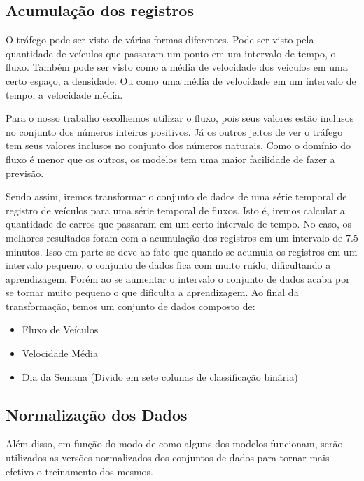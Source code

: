 \subsection{Acumulação dos registros}

O tráfego pode ser visto de várias formas diferentes. Pode ser visto pela quantidade de veículos que passaram um ponto em um intervalo de tempo, o fluxo. Também pode ser visto como a média de velocidade dos veículos em uma certo espaço, a densidade. Ou como uma média de velocidade em um intervalo de tempo, a velocidade média.

Para o nosso trabalho escolhemos utilizar o fluxo, pois seus valores estão inclusos no conjunto dos números inteiros positivos. Já os outros jeitos de ver o tráfego tem seus valores inclusos no conjunto dos números naturais. Como o domínio do fluxo é menor que os outros, os modelos tem uma maior facilidade de fazer a previsão.

Sendo assim, iremos transformar o conjunto de dados de uma série temporal de registro de veículos para uma série temporal de fluxos. Isto é, iremos calcular a quantidade de carros que passaram em um certo intervalo de tempo. No caso, os melhores resultados foram com a acumulação dos registros em um intervalo de 7.5 minutos. Isso em parte se deve ao fato que quando se acumula os registros em um intervalo pequeno, o conjunto de dados fica com muito ruído, dificultando a aprendizagem. Porém ao se aumentar o intervalo o conjunto de dados acaba por se tornar muito pequeno o que dificulta a aprendizagem. Ao final da transformação, temos um conjunto de dados composto de:

\begin{itemize}
    \item Fluxo de Veículos
    \item Velocidade Média
    \item Dia da Semana (Divido em sete colunas de classificação binária)
\end{itemize}

\subsection{Normalização dos Dados}

Além disso, em função do modo de como alguns dos modelos funcionam, serão utilizados as versões normalizados dos conjuntos de dados para tornar mais efetivo o treinamento dos mesmos.

